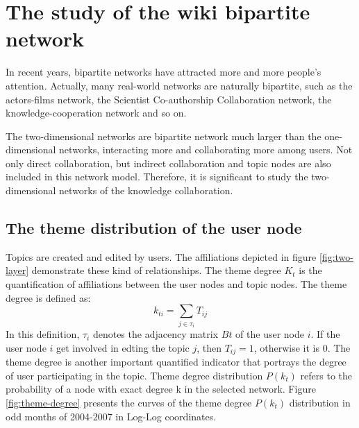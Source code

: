 \documentclass{elsarticle}
\begin{document}
\section{The  study of the wiki bipartite network}
\label{sec:4the-pilot-study}

In recent years, bipartite networks have attracted more and more people's attention\cite{watts1998sw,morris-2005,PhysRevE.64.026118}. Actually, many real-world networks are naturally bipartite, such as the actors-films network\cite{watts1998sw}, the Scientist Co-authorship Collaboration network\cite{morris-2005,PhysRevE.64.026118}, the knowledge-cooperation network and so on.

The two-dimensional networks are  bipartite network much larger than the one-dimensional
networks, interacting more and collaborating more among users. Not only
direct collaboration, but indirect collaboration and topic nodes are
also included in this network model. Therefore, it is  significant to study the
two-dimensional networks of the knowledge collaboration. 

\subsection{The theme distribution of the user node}
\label{sec:theme-distr-user}

Topics are created and edited by users. The affiliations depicted in
figure \ref{fig:two-layer} demonstrate these kind of relationships. 
The theme degree $K_t$ is the quantification of
affiliations between  the user nodes and topic nodes. The theme degree is
defined as:
\begin{equation}
  \label{eq:1}
  k_{ti}=\sum_{j \in \tau_i} T_{ij}
\end{equation}
In this definition, $\tau_i$ denotes the adjacency matrix  $Bt$ of the user node $i$. If the user node $i$ get involved in  edting the topic
$j$, then $T_{ij}=1$, otherwise
it is 0. The theme degree is
another important quantified indicator that portrays the degree of
user participating in the topic. Theme degree distribution $P(k_t)$
refers to the probability of a node with exact degree k in the
selected network. Figure \ref{fig:theme-degree} presents the curves of the theme degree
$P(k_t)$  distribution  in odd months of 2004-2007 in Log-Log
coordinates. 
\end{document}
